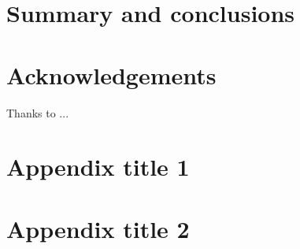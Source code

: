 \documentclass[final,5p,times,twocolumn,authoryear]{elsarticle}
\begin{document}
\section{Summary and conclusions}
\lipsum[1-4]


\section*{Acknowledgements}
Thanks to ...

\appendix

\section{Appendix title 1}

\section{Appendix title 2}

 







\end{document}
